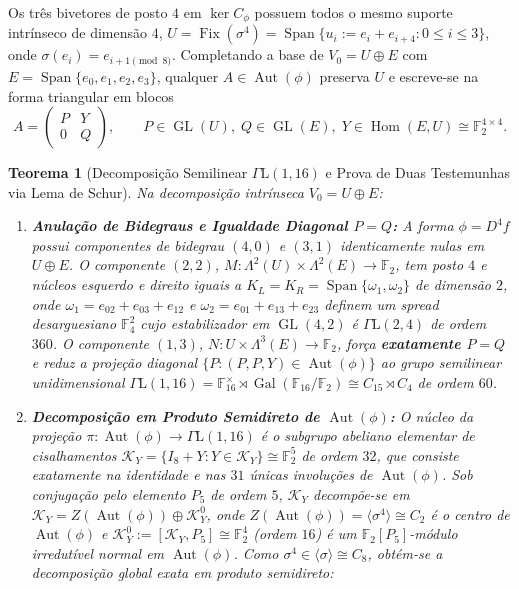 \documentclass[11pt,a4paper]{article}
\newtheorem{theorem}{Teorema}[section]
\theoremstyle{definition}
\theoremstyle{remark}
\newcommand{\F}{\mathbb{F}_2}
\newcommand{\FF}{\mathbb{F}_{16}}
\newcommand{\Aut}{\operatorname{Aut}}
\newcommand{\Fix}{\operatorname{Fix}}
\newcommand{\Hom}{\operatorname{Hom}}
\newcommand{\GL}{\operatorname{GL}}
\newcommand{\GammaL}{\Gamma\mathrm{L}}
\begin{document}
Os três bivetores de posto $4$ em $\ker C_\phi$ possuem todos o mesmo suporte intrínseco de dimensão $4$, $U = \Fix(\sigma^4) = \operatorname{Span}\{u_i := e_i + e_{i+4} : 0 \le i \le 3\}$, onde $\sigma(e_i) = e_{i+1 \pmod 8}$. Completando a base de $V_0 = U \oplus E$ com $E = \operatorname{Span}\{e_0,e_1,e_2,e_3\}$, qualquer $A \in \Aut(\phi)$ preserva $U$ e escreve-se na forma triangular em blocos
\begin{equation}\label{eq:block_form}
  A = \begin{pmatrix} P & Y \\ 0 & Q \end{pmatrix}, \qquad P \in \GL(U),\; Q \in \GL(E),\; Y \in \Hom(E, U) \cong \F^{4\times 4}.
\end{equation}

\begin{theorem}[Decomposição Semilinear $\GammaL(1,16)$ e Prova de Duas Testemunhas via Lema de Schur]\label{thm:c3_structure}
Na decomposição intrínseca $V_0 = U \oplus E$:
\begin{enumerate}
  \item \textbf{Anulação de Bidegraus e Igualdade Diagonal $P = Q$:} A forma $\phi = D^4 f$ possui componentes de bidegrau $(4,0)$ e $(3,1)$ identicamente nulas em $U \oplus E$. O componente $(2,2)$, $M : \Lambda^2(U) \times \Lambda^2(E) \to \F$, tem posto $4$ e núcleos esquerdo e direito iguais a $K_L = K_R = \operatorname{Span}\{\omega_1, \omega_2\}$ de dimensão $2$, onde $\omega_1 = e_{02}+e_{03}+e_{12}$ e $\omega_2 = e_{01}+e_{13}+e_{23}$ definem um \emph{spread} desarguesiano $\mathbb{F}_4^2$ cujo estabilizador em $\GL(4,2)$ é $\GammaL(2,4)$ de ordem $360$. O componente $(1,3)$, $N : U \times \Lambda^3(E) \to \F$, força \textbf{exatamente $P = Q$} e reduz a projeção diagonal $\{P : (P,P,Y) \in \Aut(\phi)\}$ ao grupo semilinear unidimensional $\GammaL(1,16) = \FF^\times \rtimes \operatorname{Gal}(\FF/\F) \cong C_{15} \rtimes C_4$ de ordem $60$.
  \item \textbf{Decomposição em Produto Semidireto de $\Aut(\phi)$:} O núcleo da projeção $\pi : \Aut(\phi) \to \GammaL(1,16)$ é o subgrupo abeliano elementar de cisalhamentos $\mathcal{K}_Y = \{I_8 + Y : Y \in \mathcal{K}_Y\} \cong \F^5$ de ordem $32$, que consiste exatamente na identidade e nas $31$ únicas involuções de $\Aut(\phi)$. Sob conjugação pelo elemento $P_5$ de ordem $5$, $\mathcal{K}_Y$ decompõe-se em $\mathcal{K}_Y = Z(\Aut(\phi)) \oplus \mathcal{K}_Y^0$, onde $Z(\Aut(\phi)) = \langle\sigma^4\rangle \cong C_2$ é o centro de $\Aut(\phi)$ e $\mathcal{K}_Y^0 := [\mathcal{K}_Y, P_5] \cong \F^4$ (ordem $16$) é um $\F[P_5]$-módulo irredutível normal em $\Aut(\phi)$. Como $\sigma^4 \in \langle\sigma\rangle \cong C_8$, obtém-se a decomposição global exata em produto semidireto:

\end{enumerate}
\end{theorem}
\end{document}
